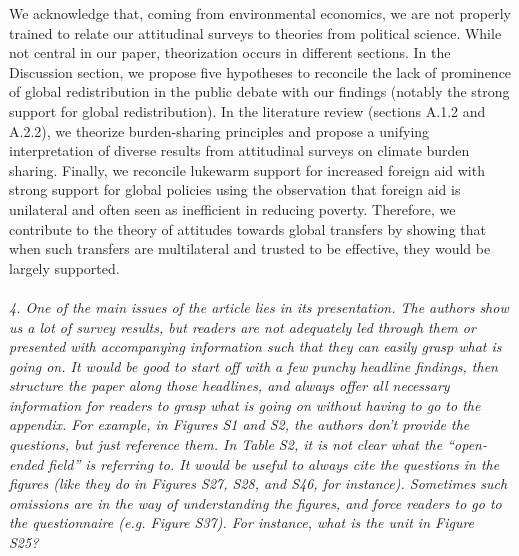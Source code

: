 \documentclass[12pt,english]{article}
\begin{document}
We acknowledge that, coming from environmental economics, we are not properly trained to relate our attitudinal surveys to theories from political science. 
While not central in our paper, theorization occurs in different sections. In the Discussion section, we propose five hypotheses to reconcile the lack of prominence of global redistribution in the public debate with our findings (notably the strong support for global redistribution). In the literature review (sections A.1.2 and A.2.2), we theorize burden-sharing principles and propose a unifying interpretation of diverse results from attitudinal surveys on climate burden sharing. %
Finally, we reconcile lukewarm support for increased foreign aid with strong support for global policies using the observation that foreign aid is unilateral and often seen as inefficient in reducing poverty. Therefore, we contribute to the theory of attitudes towards global transfers by showing that when such transfers are multilateral and trusted to be effective, they would be largely supported. %
~\\ ~\\

\textit{4. One of the main issues of the article lies in its presentation. The authors show us a lot of survey results, but readers are not adequately led through them or presented with accompanying information such that they can easily grasp what is going on. It would be good to start off with a few punchy headline findings, then structure the paper along those headlines, and always offer all necessary information for readers to grasp what is going on without having to go to the appendix. For example, in Figures S1 and S2, the authors don’t provide the questions, but just reference them. In Table S2, it is not clear what the “open-ended field” is referring to. It would be useful to always cite the questions in the figures (like they do in Figures S27, S28, and S46, for instance). Sometimes such omissions are in the way of understanding the figures, and force readers to go to the questionnaire (e.g. Figure S37). For instance, what is the unit in Figure S25?}~\\

\end{document}
